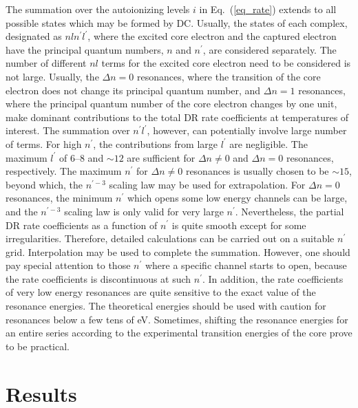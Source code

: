 \documentclass[preprint, floatfix, pra, showpacs, showkeys]{revtex4}
\begin{document}
The summation over the autoionizing levels $i$ in Eq.~(\ref{eq_rate})
extends to all possible states which may be formed by DC. Usually, the states
of each 
complex, designated as $nln^\prime l^\prime$, where the excited core electron
and the captured electron have the principal quantum numbers, $n$ and
$n^\prime$, are considered separately. 
The number of different $nl$ terms for the excited core
electron need to be considered is not large. Usually, the $\Delta n = 0$
resonances, where the transition of the core electron does not change its
principal quantum number, and $\Delta n = 1$ resonances, where the principal
quantum number of the core electron changes by one unit, make
dominant contributions to the 
total DR rate coefficients at temperatures of interest. The summation
over $n^\prime l^\prime$, however, can potentially involve large number of
terms. For high $n^\prime$, the contributions from large $l^\prime$ are
negligible. The maximum $l^\prime$ of 6--8 and $\sim 12$ are sufficient for
$\Delta n \ne 0$ and $\Delta n = 0$ resonances, respectively. The maximum
$n^\prime$ for $\Delta n \ne 0$ resonances is usually chosen to be $\sim 15$,
beyond which, the $n^{\prime -3}$ scaling law may be used for
extrapolation. For $\Delta n = 0$ resonances, the minimum $n^\prime$ which
opens some low energy channels can be large, and the $n^{\prime -3}$ scaling
law is only valid for very large $n^\prime$. Nevertheless, the partial DR rate
coefficients as a function of $n^\prime$ is quite smooth except for some
irregularities. Therefore, detailed 
calculations can be carried out on a suitable $n^\prime$ grid.
Interpolation may be used to complete the summation. However, one should pay
special attention to those $n^\prime$ where a specific channel starts to
open, because the rate coefficients is discontinuous at such $n^\prime$. In
addition, the rate coefficients of very low energy resonances are quite
sensitive to the exact value of the resonance energies. The theoretical
energies should be used with caution for resonances below a few tens of
eV. Sometimes, shifting the resonance energies for an entire series according
to the experimental transition energies of the core prove to be practical.

\section{Results}
\label{sec_results}
\end{document}
